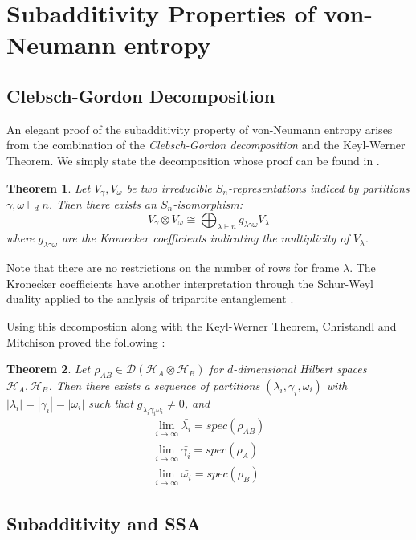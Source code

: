 \documentclass[12pt]{article}%
\newtheorem{thm}{Theorem}
\begin{document}
\section{Subadditivity Properties of von-Neumann entropy}

\subsection{Clebsch-Gordon Decomposition}
An elegant proof of the subadditivity property of von-Neumann entropy arises from the combination of the \textit{Clebsch-Gordon decomposition} and the Keyl-Werner Theorem. We simply state the decomposition whose proof can be found in \cite{FH}.

\begin{thm}
  Let $V_{\gamma}, V_{\omega}$ be two irreducible $S_n$-representations indiced by partitions $\gamma,\omega \vdash_d n$. Then there exists an $S_n$-isomorphism:
  $$ V_{\gamma} \otimes V_{\omega} \cong \bigoplus_{\lambda \vdash n} g_{\lambda\gamma\omega} V_{\lambda}$$ where $g_{\lambda\gamma\omega}$ are the Kronecker coefficients indicating the multiplicity of $V_\lambda$.
\end{thm}
\noindent Note that there are no restrictions on the number of rows for frame $\lambda$. The Kronecker coefficients have another interpretation through the Schur-Weyl duality applied to the analysis of tripartite entanglement \cite{CSW}.

\noindent Using this decompostion along with the Keyl-Werner Theorem, Christandl and Mitchison proved the following \cite{CM}:

\begin{thm} \label{converge}
  Let $\rho_{AB} \in \mathcal{D}(\mathcal{H}_A \otimes \mathcal{H}_B)$ for $d$-dimensional Hilbert spaces $\mathcal{H}_A, \mathcal{H}_B$. Then there exists a sequence of partitions $(\lambda_i, \gamma_i, \omega_i)$ with $|\lambda_i| = |\gamma_i| = |\omega_i|$ such that $g_{\lambda_i\gamma_i\omega_i} \neq 0$, and
  \begin{gather*}
    \lim_{i \rightarrow \infty} \bar{\lambda_i} = spec(\rho_{AB}) \\
    \lim_{i \rightarrow \infty} \bar{\gamma_i} = spec(\rho_A) \\
    \lim_{i \rightarrow \infty} \bar{\omega_i} =  spec(\rho_B)
  \end{gather*}
\end{thm}
\subsection{Subadditivity and SSA}
\end{document}
